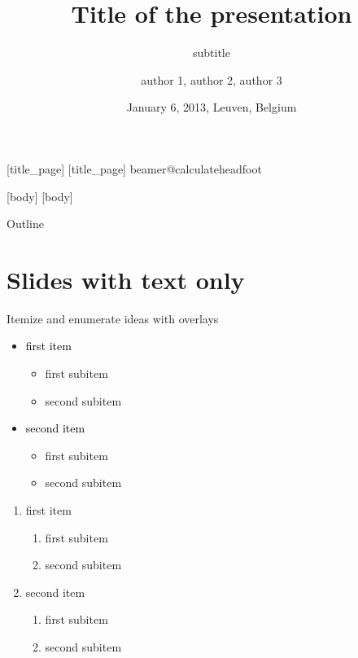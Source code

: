 \documentclass[11pt,t]{beamer}
\title{Title of the presentation}
\author{author 1, author 2, author 3}
\institute{Group, department, KU Leuven}
\subtitle{subtitle}
\date{January 6, 2013, Leuven, Belgium}
\begin{document}
	[title_page]
	[title_page]
	\csname beamer@calculateheadfoot\endcsname %
		\begin{frame}
			\titlepage
		\end{frame}
	[body]
	[body]

\begin{frame}{Outline}
	\vskip 5mm
	\hfill	{\large \parbox{.95\textwidth}{\tableofcontents[hideallsubsections]}}
\end{frame}

\section{Slides with text only}
\begin{frame}{Itemize and enumerate ideas with overlays}
	\begin{itemize}
		\item \textcolor{black}{first item}
			\begin{itemize}
				\item first subitem
				\item second subitem
			\end{itemize}
		\item \textcolor{black}{second item}
			\begin{itemize}
				\item first subitem
				\item second subitem
			\end{itemize}
	\end{itemize}
	\vspace{2mm}
	\begin{enumerate}
		\item<2-> first item
		\begin{enumerate}
			\item first subitem
			\item second subitem
		\end{enumerate}
		\item<2-> second item
		\begin{enumerate}
			\item first subitem
			\item second subitem
		\end{enumerate}
	\end{enumerate}
\end{frame}
\end{document}
